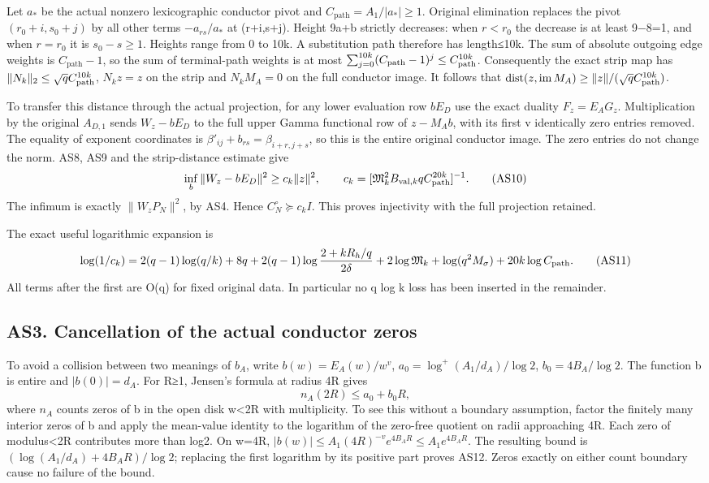 \documentclass[11pt]{article}
\begin{document}
Let \(a_*\) be the actual nonzero lexicographic conductor pivot and \(C_{\mathrm{path}}=A_1/|a_*|\ge1\). Original elimination replaces the pivot \((r_0+i,s_0+j)\) by all other terms \(-a_{rs}/a_*\) at (r+i,s+j). Height 9a+b strictly decreases: when \(r<r_0\) the decrease is at least 9−8=1, and when \(r=r_0\) it is \(s_0-s\ge1\). Heights range from 0 to 10k. A substitution path therefore has length≤10k. The sum of absolute outgoing edge weights is \(C_{\mathrm{path}}-1\), so the sum of terminal-path weights is at most \(\sum_{j=0}^{10k}(C_{\rm path}-1)^j\le C_{\rm path}^{10k}\). Consequently the exact strip map has \(\|N_k\|_2\le\sqrt qC_{\rm path}^{10k}\), \(N_kz=z\) on the strip and \(N_kM_A=0\) on the full conductor image. It follows that \(\operatorname{dist}(z,\operatorname{im}M_A)\ge\|z\|/(\sqrt qC_{\rm path}^{10k})\).

To transfer this distance through the actual projection, for any lower evaluation row \(bE_D\) use the exact duality \(F_z=E_AG_z\). Multiplication by the original \(A_{D,1}\) sends \(W_z-bE_D\) to the full upper Gamma functional row of \(z-M_Ab\), with its first v identically zero entries removed. The equality of exponent coordinates is \(\beta'_{ij}+b_{rs}=\beta_{i+r,j+s}\), so this is the entire original conductor image. The zero entries do not change the norm. AS8, AS9 and the strip-distance estimate give \[
\inf_b\|W_z-bE_D\|^2
\ge c_k\|z\|^2,\qquad
c_k=[\mathfrak M_k^2B_{\mathrm{val},k}qC_{\rm path}^{20k}]^{-1}.
\tag{AS10}
\] The infimum is exactly \(\|W_zP_N\|^2\), by AS4. Hence \(C_N^\circ\succeq c_kI\). This proves injectivity with the full projection retained.

The exact useful logarithmic expansion is \[
\log(1/c_k)=2(q-1)\log(q/k)+8q
+2(q-1)\log\frac{2+kR_h/q}{2\delta}
+2\log\mathfrak M_k+\log(q^2M_\sigma)+20k\log C_{\rm path}.
\tag{AS11}
\] All terms after the first are O(q) for fixed original data. In particular no q log k loss has been inserted in the remainder.

\subsection{AS3. Cancellation of the actual conductor zeros}\label{as3.-cancellation-of-the-actual-conductor-zeros}

To avoid a collision between two meanings of \(b_A\), write \(b(w)=E_A(w)/w^v\), \(a_0=\log^+(A_1/d_A)/\log2\), \(b_0=4B_A/\log2\). The function b is entire and \(|b(0)|=d_A\). For R≥1, Jensen's formula at radius 4R gives \[
n_A(2R)\le a_0+b_0R,
\tag{AS12}
\] where \(n_A\) counts zeros of b in the open disk \textbar w\textbar\textless2R with multiplicity. To see this without a boundary assumption, factor the finitely many interior zeros of b and apply the mean-value identity to the logarithm of the zero-free quotient on radii approaching 4R. Each zero of modulus\textless2R contributes more than log2. On \textbar w\textbar=4R, \(|b(w)|\le A_1(4R)^{-v}e^{4B_AR}\le A_1e^{4B_AR}\). The resulting bound is \((\log(A_1/d_A)+4B_AR)/\log2\); replacing the first logarithm by its positive part proves AS12. Zeros exactly on either count boundary cause no failure of the bound.
\end{document}
